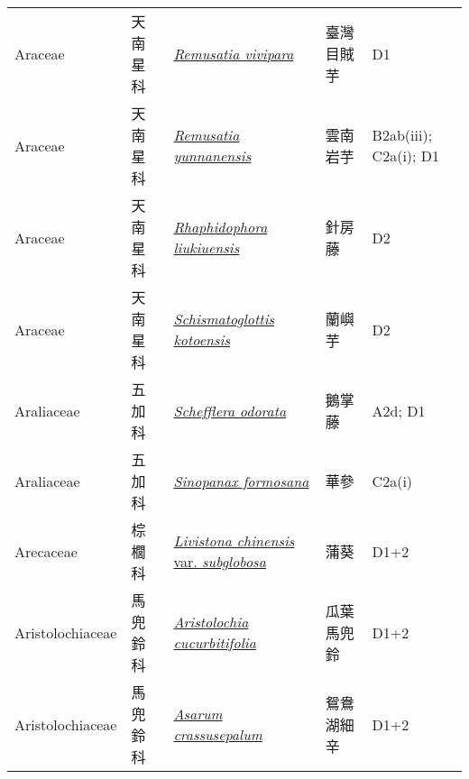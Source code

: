 {\begin{longtable}{L{2.5cm}L{2cm}L{5cm}L{2.5cm}L{3cm}}
    Araceae & 天南星科 & \href{http://www.theplantlist.org/tpl1.1/search?q=Remusatia+vivipara}{\textit{Remusatia vivipara} } & 臺灣目賊芋 & D1    \\
    Araceae & 天南星科 & \href{http://www.theplantlist.org/tpl1.1/search?q=Remusatia+yunnanensis}{\textit{Remusatia yunnanensis} } & 雲南岩芋 & B2ab(iii); C2a(i); D1    \\
    Araceae & 天南星科 & \href{http://www.theplantlist.org/tpl1.1/search?q=Rhaphidophora+liukiuensis}{\textit{Rhaphidophora liukiuensis} } & 針房藤 & D2    \\
    Araceae & 天南星科 & \href{http://www.theplantlist.org/tpl1.1/search?q=Schismatoglottis+kotoensis}{\textit{Schismatoglottis kotoensis} } & 蘭嶼芋 & D2    \\
    Araliaceae & 五加科 & \href{http://www.theplantlist.org/tpl1.1/search?q=Schefflera+odorata}{\textit{Schefflera odorata} } & 鵝掌藤 & A2d; D1    \\
    Araliaceae & 五加科 & \href{http://www.theplantlist.org/tpl1.1/search?q=Sinopanax+formosana}{\textit{Sinopanax formosana} } & 華參 & C2a(i)    \\
    Arecaceae & 棕櫚科 & \href{http://www.theplantlist.org/tpl1.1/search?q=Livistona+chinensis+var.+subglobosa}{\textit{Livistona chinensis} var. \textit{subglobosa} } & 蒲葵 & D1+2    \\
    Aristolochiaceae & 馬兜鈴科 & \href{http://www.theplantlist.org/tpl1.1/search?q=Aristolochia+cucurbitifolia}{\textit{Aristolochia cucurbitifolia} } & 瓜葉馬兜鈴 & D1+2    \\
    Aristolochiaceae & 馬兜鈴科 & \href{http://www.theplantlist.org/tpl1.1/search?q=Asarum+crassusepalum}{\textit{Asarum crassusepalum} } & 鴛鴦湖細辛 & D1+2    \\

\end{longtable}}
